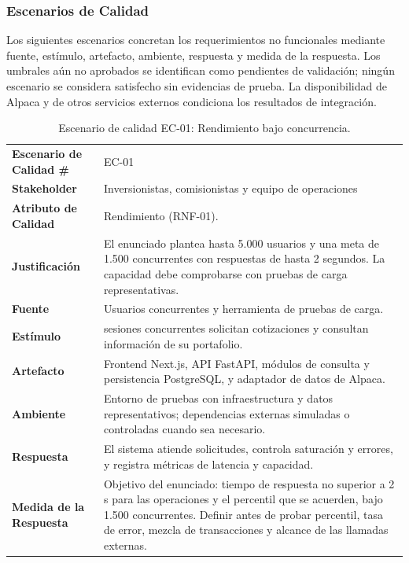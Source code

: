 \documentclass[11pt,a4paper,oneside]{article}
\begin{document}
\subsubsection{Escenarios de Calidad}
Los siguientes escenarios concretan los requerimientos no funcionales mediante fuente, estímulo, artefacto, ambiente, respuesta y medida de la respuesta. Los umbrales aún no aprobados se identifican como pendientes de validación; ningún escenario se considera satisfecho sin evidencias de prueba. La disponibilidad de Alpaca y de otros servicios externos condiciona los resultados de integración.

\begingroup
\small
\setlength{\tabcolsep}{5pt}
\renewcommand{\arraystretch}{1.25}
\newlength{\anchoEscenario}
\setlength{\anchoEscenario}{\dimexpr\textwidth-4\tabcolsep-3\arrayrulewidth\relax}
\newcommand{\campoEscenario}[2]{\cellcolor{azulTabla}\bfseries #1 & #2\\\hline}
\newcommand{\inicioEscenario}[3]{%
\begin{table}[H]\centering
\caption{Escenario de calidad #1: #2.}\label{tab:escenario-#1}
\begin{tabular}{|>{\RaggedRight\arraybackslash}p{.28\anchoEscenario}|>{\RaggedRight\arraybackslash}p{.72\anchoEscenario}|}\hline
\rowcolor{negroTabla}\multicolumn{2}{|l|}{\color{white}\bfseries Registro de Escenario de Calidad}\\\hline
\campoEscenario{Escenario de Calidad \#}{#1}
\campoEscenario{Stakeholder}{#3}
}
\newcommand{\finEscenario}{\end{tabular}\end{table}}

\inicioEscenario{EC-01}{Rendimiento bajo concurrencia}{Inversionistas, comisionistas y equipo de operaciones}
\campoEscenario{Atributo de Calidad}{Rendimiento (RNF-01).}
\campoEscenario{Justificación}{El enunciado plantea hasta 5.000 usuarios y una meta de 1.500 concurrentes con respuestas de hasta 2 segundos. La capacidad debe comprobarse con pruebas de carga representativas.}
\campoEscenario{Fuente}{Usuarios concurrentes y herramienta de pruebas de carga.}
\campoEscenario{Estímulo}{1.500 sesiones concurrentes solicitan cotizaciones y consultan información de su portafolio.}
\campoEscenario{Artefacto}{Frontend Next.js, API FastAPI, módulos de consulta y persistencia PostgreSQL, y adaptador de datos de Alpaca.}
\campoEscenario{Ambiente}{Entorno de pruebas con infraestructura y datos representativos; dependencias externas simuladas o controladas cuando sea necesario.}
\campoEscenario{Respuesta}{El sistema atiende solicitudes, controla saturación y errores, y registra métricas de latencia y capacidad.}
\campoEscenario{Medida de la Respuesta}{Objetivo del enunciado: tiempo de respuesta no superior a 2 s para las operaciones y el percentil que se acuerden, bajo 1.500 concurrentes. Definir antes de probar percentil, tasa de error, mezcla de transacciones y alcance de las llamadas externas.}
\finEscenario
\end{document}
